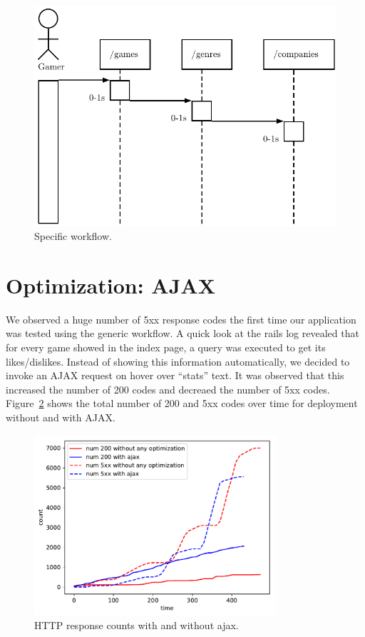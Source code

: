 \begin{figure}
	\centering
	\includegraphics{images/specific}
	\caption{Specific workflow.}\label{fig:specific}
\end{figure}

\section{Optimization: AJAX}
We observed a huge number of 5xx response codes the first time our application was tested using the generic workflow. A quick look at the rails log revealed that for every game showed in the index page, a query was executed to get its likes/dislikes. Instead of showing this information automatically, we decided to invoke an AJAX request on hover over ``stats'' text. It was observed that this increased the number of 200 codes and decreaed the number of 5xx codes. Figure~\ref{fig:numcodes} shows the total number of 200 and 5xx codes over time for deployment without and with AJAX.
\begin{figure}
	\centering
	\includegraphics[width=0.8\textwidth]{images/without-any-optimization-with-ajax.pdf}
	\caption{HTTP response counts with and without ajax.}\label{fig:numcodes}
\end{figure}

